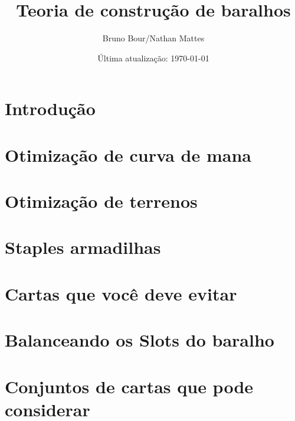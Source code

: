\documentclass[12pt, a4paper]{article}
\newcommand{\card}[1]{\href{https://gatherer.wizards.com/Pages/Card/Details.aspx?name=#1}{#1}}
\begin{document}
\bgroup\obeylines

\title{Teoria de construção de baralhos}
\author{Bruno Bour/Nathan Mattes}
\date{Última atualização: \today}
    \maketitle

    \tableofcontents
    

    \pagebreak

    
    \section{Introdução}
     \pagebreak

    \section{Otimização de curva de mana}
     \pagebreak
    
    \section{Otimização de terrenos}
     \pagebreak

    \section{Staples armadilhas}
     \pagebreak

    \section{Cartas que você deve evitar}
     \pagebreak

    \section{Balanceando os Slots do baralho}
     \pagebreak

    \section{Conjuntos de cartas que pode considerar}
     \pagebreak
\end{document}
